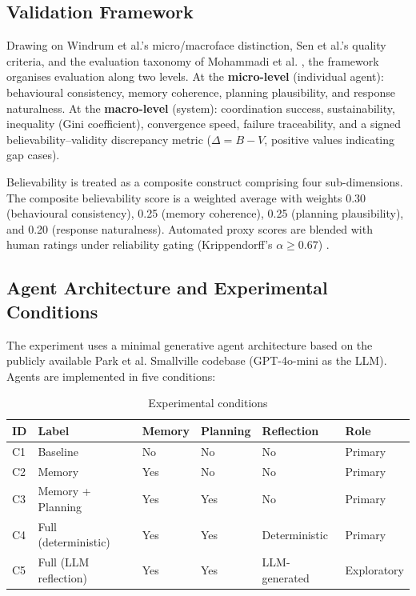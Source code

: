 \documentclass[11pt]{article}
\begin{document}
\subsection{Validation Framework}
Drawing on Windrum et al.'s \cite{windrum2007empirical} micro/macroface distinction, Sen et al.'s \cite{sen2025validating} quality criteria, and the evaluation taxonomy of Mohammadi et al. \cite{mohammadi2025evaluation}, the framework organises evaluation along two levels. At the \textbf{micro-level} (individual agent): behavioural consistency, memory coherence, planning plausibility, and response naturalness. At the \textbf{macro-level} (system): coordination success, sustainability, inequality (Gini coefficient), convergence speed, failure traceability, and a signed believability--validity discrepancy metric ($\Delta = B - V$, positive values indicating gap cases).

Believability is treated as a composite construct comprising four sub-dimensions. The composite believability score is a weighted average with weights 0.30 (behavioural consistency), 0.25 (memory coherence), 0.25 (planning plausibility), and 0.20 (response naturalness). Automated proxy scores are blended with human ratings under reliability gating (Krippendorff's $\alpha \geq 0.67$) \cite{zheng2023judging}.

\subsection{Agent Architecture and Experimental Conditions}
The experiment uses a minimal generative agent architecture based on the publicly available Park et al. Smallville codebase (GPT-4o-mini as the LLM). Agents are implemented in five conditions:

\begin{table}[h]
\centering
\caption{Experimental conditions}
\label{tab:conditions}
\begin{tabular}{llllll}
\toprule
ID & Label & Memory & Planning & Reflection & Role \\
\midrule
C1 & Baseline & No & No & No & Primary \\
C2 & Memory & Yes & No & No & Primary \\
C3 & Memory + Planning & Yes & Yes & No & Primary \\
C4 & Full (deterministic) & Yes & Yes & Deterministic & Primary \\
C5 & Full (LLM reflection) & Yes & Yes & LLM-generated & Exploratory \\
\bottomrule
\end{tabular}
\end{table}
\end{document}
